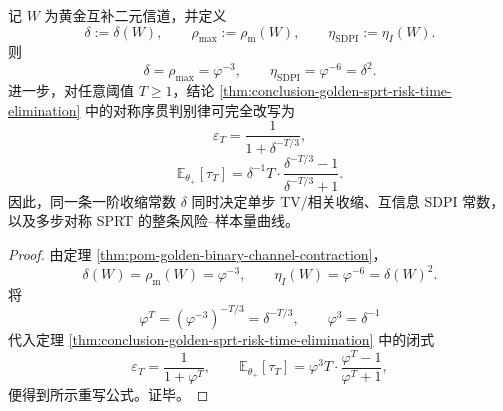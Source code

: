 \begin{theorem}[一阶收缩常数对对称序贯判别律的闭包]\label{thm:conclusion-golden-sprt-delta-closure}
记 \(W\) 为黄金互补二元信道，并定义
\[
\delta:=\delta(W),
\qquad
\rho_{\max}:=\rho_{\mathrm m}(W),
\qquad
\eta_{\mathrm{SDPI}}:=\eta_I(W).
\]
则
\[
\delta=\rho_{\max}=\varphi^{-3},
\qquad
\eta_{\mathrm{SDPI}}=\varphi^{-6}=\delta^2.
\]
进一步，对任意阈值 \(T\ge 1\)，结论 \ref{thm:conclusion-golden-sprt-risk-time-elimination} 中的对称序贯判别律可完全改写为
\[
\varepsilon_T=\frac{1}{1+\delta^{-T/3}},
\]
\[
\mathbb E_{\theta_+}[\tau_T]
=
\delta^{-1}T\cdot
\frac{\delta^{-T/3}-1}{\delta^{-T/3}+1}.
\]
因此，同一条一阶收缩常数 \(\delta\) 同时决定单步 TV/相关收缩、互信息 SDPI 常数，以及多步对称 SPRT 的整条风险--样本量曲线。
\end{theorem}

\begin{proof}
由定理 \ref{thm:pom-golden-binary-channel-contraction}，
\[
\delta(W)=\rho_{\mathrm m}(W)=\varphi^{-3},
\qquad
\eta_I(W)=\varphi^{-6}=\delta(W)^2.
\]
将
\[
\varphi^T=(\varphi^{-3})^{-T/3}=\delta^{-T/3},
\qquad
\varphi^3=\delta^{-1}
\]
代入定理 \ref{thm:conclusion-golden-sprt-risk-time-elimination} 中的闭式
\[
\varepsilon_T=\frac{1}{1+\varphi^T},
\qquad
\mathbb E_{\theta_+}[\tau_T]
=
\varphi^3T\cdot\frac{\varphi^T-1}{\varphi^T+1},
\]
便得到所示重写公式。证毕。
\end{proof}

\endinput
